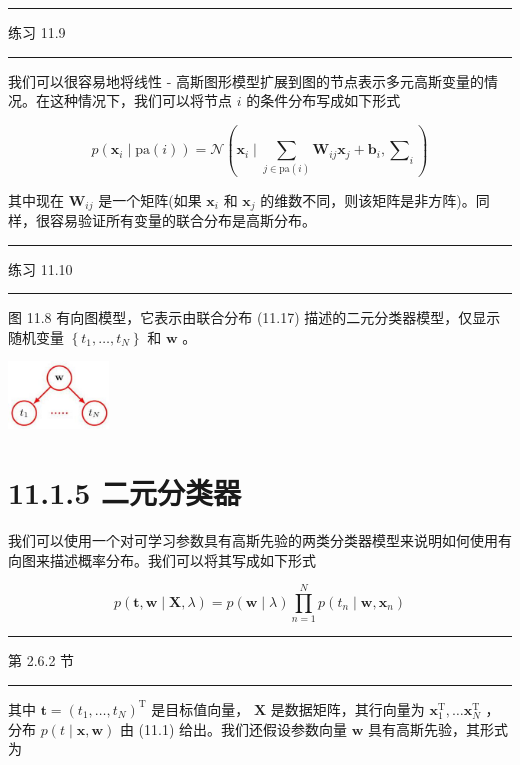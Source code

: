 \documentclass[10pt]{report}
\newcommand{\HRule}{\begin{center}\rule{0.9\linewidth}{0.2mm}\end{center}}
\begin{document}
\HRule

练习 11.9

\HRule

我们可以很容易地将线性 - 高斯图形模型扩展到图的节点表示多元高斯变量的情况。在这种情况下，我们可以将节点 \(i\) 的条件分布写成如下形式

\[
p\left( {{\mathbf{x}}_{i} \mid  \mathrm{{pa}}\left( i\right) }\right)  = \mathcal{N}\left( {{\mathbf{x}}_{i} \mid  \mathop{\sum }\limits_{{j \in  \mathrm{{pa}}\left( i\right) }}{\mathbf{W}}_{ij}{\mathbf{x}}_{j} + {\mathbf{b}}_{i},{\mathbf{\sum }}_{i}}\right)  \tag{11.16}
\]

其中现在 \({\mathbf{W}}_{ij}\) 是一个矩阵(如果 \({\mathbf{x}}_{i}\) 和 \({\mathbf{x}}_{j}\) 的维数不同，则该矩阵是非方阵)。同样，很容易验证所有变量的联合分布是高斯分布。

\HRule

练习 11.10

\HRule

图 11.8 有向图模型，它表示由联合分布 (11.17) 描述的二元分类器模型，仅显示随机变量 \(\left\{  {{t}_{1},\ldots ,{t}_{N}}\right\}\) 和 \(\mathbf{w}\) 。

\begin{center}
\includegraphics[max width=0.2\textwidth]{images/0194e279-9b28-703a-88f4-c3ac21e2010d_353_1287_346_264_178_0.jpg}
\end{center}
\hspace*{3em} 

\section*{11.1.5 二元分类器}

我们可以使用一个对可学习参数具有高斯先验的两类分类器模型来说明如何使用有向图来描述概率分布。我们可以将其写成如下形式

\[
p\left( {\mathbf{t},\mathbf{w} \mid  \mathbf{X},\lambda }\right)  = p\left( {\mathbf{w} \mid  \lambda }\right) \mathop{\prod }\limits_{{n = 1}}^{N}p\left( {{t}_{n} \mid  \mathbf{w},{\mathbf{x}}_{n}}\right)  \tag{11.17}
\]

\HRule

第 2.6.2 节

\HRule

其中 \(\mathbf{t} = {\left( {t}_{1},\ldots ,{t}_{N}\right) }^{\mathrm{T}}\) 是目标值向量， \(\mathbf{X}\) 是数据矩阵，其行向量为 \({\mathbf{x}}_{1}^{\mathrm{T}},\ldots {\mathbf{x}}_{N}^{\mathrm{T}}\) ，分布 \(p\left( {t \mid  \mathbf{x},\mathbf{w}}\right)\) 由 (11.1) 给出。我们还假设参数向量 \(\mathbf{w}\) 具有高斯先验，其形式为
\end{document}
